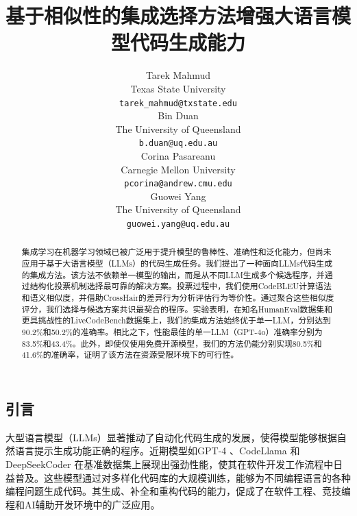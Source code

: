 \documentclass{article}
\begin{document}
\begin{CJK*}{UTF8}{gbsn}

\title{基于相似性的集成选择方法增强大语言模型代码生成能力}

\author{
 Tarek Mahmud \\
  Texas State University\\
  \texttt{tarek\_mahmud@txstate.edu} \\
   \And
 Bin Duan \\
  The University of Queensland \\
  \texttt{b.duan@uq.edu.au} \\
  \And
 Corina Pasareanu \\
  Carnegie Mellon University \\
  \texttt{pcorina@andrew.cmu.edu} \\
  \And
 Guowei Yang \\
  The University of Queensland \\
  \texttt{guowei.yang@uq.edu.au} \\
}

\maketitle
\begin{abstract}
集成学习在机器学习领域已被广泛用于提升模型的鲁棒性、准确性和泛化能力，但尚未应用于基于大语言模型（LLMs）的代码生成任务。我们提出了一种面向LLMs代码生成的集成方法。该方法不依赖单一模型的输出，而是从不同LLM生成多个候选程序，并通过结构化投票机制选择最可靠的解决方案。投票过程中，我们使用CodeBLEU计算语法和语义相似度，并借助CrossHair的差异行为分析评估行为等价性。通过聚合这些相似度评分，我们选择与候选方案共识最契合的程序。实验表明，在知名HumanEval数据集和更具挑战性的LiveCodeBench数据集上，我们的集成方法始终优于单一LLM，分别达到90.2\%和50.2\%的准确率。相比之下，性能最佳的单一LLM（GPT-4o）准确率分别为83.5\%和43.4\%。此外，即使仅使用免费开源模型，我们的方法仍能分别实现80.5\%和41.6\%的准确率，证明了该方法在资源受限环境下的可行性。
\end{abstract}

\section{引言}
大型语言模型（LLMs）\cite{brown2020language}显著推动了自动化代码生成的发展，使得模型能够根据自然语言提示生成功能正确的程序。近期模型如GPT-4 \cite{gpt4}、CodeLlama \cite{codellama}和DeepSeekCoder \cite{deepseekcoder}在基准数据集上展现出强劲性能，使其在软件开发工作流程中日益普及。这些模型通过对多样化代码库的大规模训练，能够为不同编程语言的各种编程问题生成代码。其生成、补全和重构代码的能力，促成了在软件工程、竞技编程和AI辅助开发环境中的广泛应用。


\end{CJK*}
\end{document}
